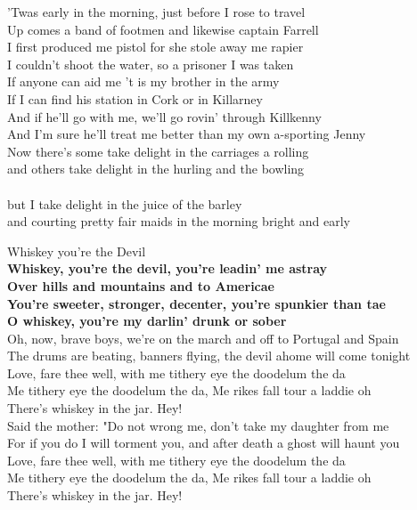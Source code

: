 \documentclass[letterpaper,9pt]{article}
\begin{document}
'Twas early in the morning, just before I rose to travel \\
Up comes a band of footmen and likewise captain Farrell \\
I first produced me pistol for she stole away me rapier \\
I couldn't shoot the water, so a prisoner I was taken \\

If anyone can aid me 't is my brother in the army \\
If I can find his station in Cork or in Killarney \\
And if he'll go with me, we'll go rovin' through Killkenny \\
And I'm sure he'll treat me better than my own a-sporting Jenny \\

Now there's some take delight in the carriages a rolling \\
and others take delight in the hurling and the bowling \\ \\
but I take delight in the juice of the barley \\
and courting pretty fair maids in the morning bright and early \\

\newpage
{}
\Huge
Whiskey you're the Devil\\

\LARGE
\textbf{Whiskey, you're the devil, you're leadin' me astray \\
Over hills and mountains and to Americae \\
You're sweeter, stronger, decenter, you're spunkier than tae \\
O whiskey, you're my darlin' drunk or sober} \\

Oh, now, brave boys, we're on the march and off to Portugal and Spain \\
The drums are beating, banners flying, the devil ahome will come tonight \\
Love, fare thee well, with me tithery eye the doodelum the da \\
Me tithery eye the doodelum the da, Me rikes fall tour a laddie oh \\
There's whiskey in the jar. Hey! \\

Said the mother: "Do not wrong me, don't take my daughter from me \\
For if you do I will torment you, and after death a ghost will haunt you \\
Love, fare thee well, with me tithery eye the doodelum the da \\
Me tithery eye the doodelum the da, Me rikes fall tour a laddie oh \\
There's whiskey in the jar. Hey! \\
\end{document}
